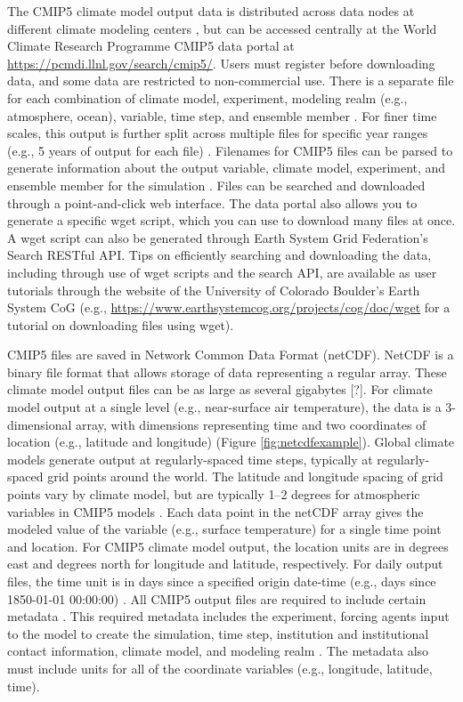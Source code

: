 The CMIP5 climate model output data is distributed across data nodes at
different climate modeling centers \citep{taylor2012overview}, but can
be accessed centrally at the World Climate Research Programme CMIP5 data
portal at \url{https://pcmdi.llnl.gov/search/cmip5/}. Users must
register before downloading data, and some data are restricted to
non-commercial use. There is a separate file for each combination of
climate model, experiment, modeling realm (e.g., atmosphere, ocean),
variable, time step, and ensemble member
\citep{taylor2012overview, taylor2010cmip5}. For finer time scales, this
output is further split across multiple files for specific year ranges
(e.g., 5 years of output for each file) \citep{taylor2010cmip5}.
Filenames for CMIP5 files can be parsed to generate information about
the output variable, climate model, experiment, and ensemble member for
the simulation \citep{taylor2010cmip5}. Files can be searched and
downloaded through a point-and-click web interface. The data portal also
allows you to generate a specific wget script, which you can use to
download many files at once. A wget script can also be generated through
Earth System Grid Federation's Search RESTful API. Tips on efficiently
searching and downloading the data, including through use of wget
scripts and the search API, are available as user tutorials through the
website of the University of Colorado Boulder's Earth System CoG (e.g.,
\url{https://www.earthsystemcog.org/projects/cog/doc/wget} for a
tutorial on downloading files using wget).

CMIP5 files are saved in Network Common Data Format (netCDF). NetCDF is
a binary file format that allows storage of data representing a regular
array. These climate model output files can be as large as several
gigabytes {[}?{]}. For climate model output at a single level (e.g.,
near-surface air temperature), the data is a 3-dimensional array, with
dimensions representing time and two coordinates of location (e.g.,
latitude and longitude) (Figure \ref{fig:netcdfexample}). Global climate
models generate output at regularly-spaced time steps, typically at
regularly-spaced grid points around the world. The latitude and
longitude spacing of grid points vary by climate model, but are
typically 1--2 degrees for atmospheric variables in CMIP5 models
\citep{IPCCch9}. Each data point in the netCDF array gives the modeled
value of the variable (e.g., surface temperature) for a single time
point and location. For CMIP5 climate model output, the location units
are in degrees east and degrees north for longitude and latitude,
respectively. For daily output files, the time unit is in days since a
specified origin date-time (e.g., days since 1850-01-01 00:00:00)
\citep{taylor2010cmip5}. All CMIP5 output files are required to include
certain metadata \citep{taylor2010cmip5}. This required metadata
includes the experiment, forcing agents input to the model to create the
simulation, time step, institution and institutional contact
information, climate model, and modeling realm \citep{taylor2010cmip5}.
The metadata also must include units for all of the coordinate variables
(e.g., longitude, latitude, time).

